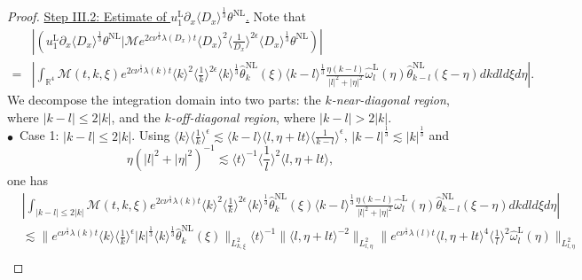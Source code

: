 \documentclass[reqno, 12pt]{amsart} %
\theoremstyle{plain} %
\theoremstyle{definition}
\theoremstyle{remark}
\numberwithin{equation}{section} %
\newcommand{\no}{\nonumber}
\newcommand{\px}{\partial_x}
\begin{document}
\begin{proof}
		\underline{ Step III.2: Estimate of $u_1^{\mathrm{L}} \px \langle D_x \rangle^\frac13 \theta^{\mathrm{NL}}  $.} 
		Note that
		\begin{equation}\begin{aligned} \label{eq:temp16}
				& \left|\left(  u_1^{\mathrm{L}} \px \langle D_x \rangle^\frac13 \theta^{\mathrm{NL}} \big| \mathcal{M} e^{2 c \nu^{\frac{1}{3}} \lambda\left(D_x\right) t}\langle D_x\rangle^2\langle\frac{1}{D_x}\rangle^{2 \epsilon} \langle D_x \rangle^\frac13 \theta^{\mathrm{NL}}\right)\right| \\
				= & \left|\int_{\mathbb{R}^4} \mathcal{M}(t, k, \xi) e^{2 c \nu^{\frac{1}{3}} \lambda(k) t}\langle k\rangle^2\langle\frac{1}{k}\rangle^{2 \epsilon} \langle k \rangle^\frac13  \hat{\theta }_k^{\mathrm{NL}}(\xi) \langle k-l \rangle^\frac13 \frac{\eta(k-l)}{|l|^2+|\eta|^2} \hat{\omega}_l^{\mathrm{L}}(\eta) \hat{\theta }_{k-l}^{\mathrm{NL}}(\xi-\eta) d k d l d \xi d \eta\right|.
		\end{aligned}\end{equation}
		We decompose the integration domain into two parts: the \emph{$k$-near-diagonal region}, where $|k - l| \leq 2|k|$, and the \emph{$k$-off-diagonal region}, where $|k - l| > 2|k|$. \\
		$\bullet$~Case 1:  $|k-l|\leq 2|k|$. Using $\langle k \rangle \langle \frac1k\rangle^\epsilon \lesssim \langle k- l\rangle \langle  l, \eta + lt\rangle \langle \frac1{k-l}\rangle^\epsilon$, $|k-l|^\frac13 \lesssim |k|^\frac13 $ and
		\begin{equation} \label{eq:trick3}
			\eta  (|l|^2+|\eta|^2)^{-1}   \lesssim\langle t\rangle^{-1}\langle\frac{1}{l}\rangle^2 \langle l, \eta+l t\rangle,
		\end{equation}
		one has
		\begin{align} \label{eq:temp17}
			&\no \left|\int_{|k-l| \leq 2|k|} \mathcal{M}(t, k, \xi) e^{2 c \nu^{\frac{1}{3}} \lambda(k) t}\langle k\rangle^2\langle\frac{1}{k}\rangle^{2 \epsilon} \langle k \rangle^\frac13  \hat{\theta }_k^{\mathrm{NL}}(\xi) \langle k-l \rangle^\frac13 \frac{\eta(k-l)}{|l|^2+|\eta|^2} \hat{\omega}_l^{\mathrm{L}}(\eta) \hat{\theta }_{k-l}^{\mathrm{NL}}(\xi-\eta) d k d l d \xi d \eta\right| \\
			&\no \lesssim\|e^{c \nu^{\frac{1}{3}} \lambda(k) t}\langle k\rangle\langle\frac{1}{k}\rangle^\epsilon|k|^{\frac{1}{3}} \langle k \rangle^\frac13 \hat{\theta}_k^{\mathrm{NL}}(\xi)\|_{L_{k, \xi}^2}\langle t\rangle^{-1}\|\langle l, \eta+l t\rangle^{-2}\|_{L_{l, \eta}^2}\|e^{c \nu^{\frac{1}{3}} \lambda(l) t}\langle l, \eta+l t\rangle^4\langle\frac{1}{l}\rangle^2 \hat{\omega}_l^{\mathrm{L}}(\eta)\|_{L_{l, \eta}^2} \\

\end{align}
\end{proof}
\end{document}

